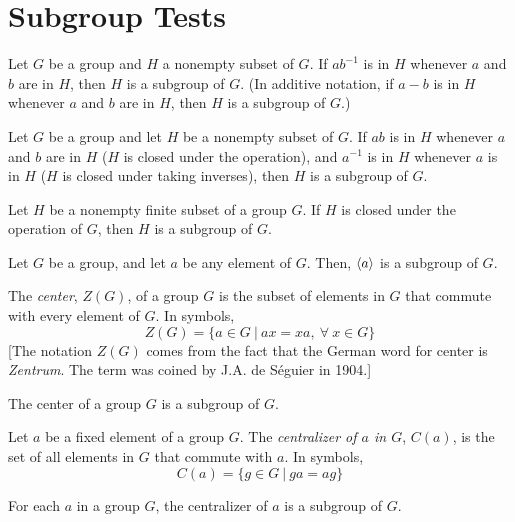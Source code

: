 \section{Subgroup Tests}

\begin{theorem}
	Let $G$ be a group and $H$ a nonempty subset of $G$. If $ab^{-1}$ is in $H$ whenever $a$ and $b$ are in $H$, then $H$ is a subgroup of $G$. (In additive notation, if $a - b$ is in $H$ whenever $a$ and $b$ are in $H$, then $H$ is a subgroup of $G$.)
\end{theorem}

\begin{theorem}
	Let $G$ be a group and let $H$ be a nonempty subset of $G$. If $ab$ is in $H$ whenever $a$ and $b$ are in $H$ ($H$ is closed under the operation), and $a^{-1}$ is in $H$ whenever $a$ is in $H$ ($H$ is closed under taking inverses), then $H$ is a subgroup of $G$.
\end{theorem}

\begin{theorem}
	Let $H$ be a nonempty finite subset of a group $G$. If $H$ is closed under the operation of $G$, then $H$ is a subgroup of $G$.
\end{theorem}

\begin{theorem}
	Let $G$ be a group, and let $a$ be any element of $G$. Then, $\langle a \rangle$ is a subgroup of $G$.
\end{theorem}

\begin{definition}
	The \textit{center}, $Z(G)$, of a group $G$ is the subset of elements in $G$ that commute with every element of $G$. In symbols,
	\[ Z(G) = \{a \in G\ \vert\ ax = xa,\ \forall\ x \in G\} \]
	[The notation $Z(G)$ comes from the fact that the German word for center is \textit{Zentrum}. The term was coined by J.A. de Séguier in 1904.]
\end{definition}

\begin{theorem}
	The center of a group $G$ is a subgroup of $G$.
\end{theorem}

\begin{definition}
	Let $a$ be a fixed element of a group $G$. The \textit{centralizer of $a$ in $G$}, $C(a)$, is the set of all elements in $G$ that commute with $a$. In symbols,
	\[ C(a) = \{g \in G\ \vert\ ga = ag\} \]
\end{definition}

\begin{theorem}
	For each $a$ in a group $G$, the centralizer of $a$ is a subgroup of $G$.
\end{theorem}
